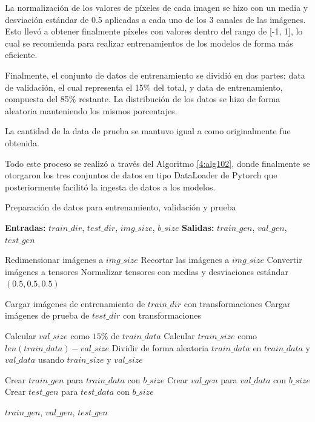 La normalización de los valores de píxeles de cada imagen se hizo con un media y desviación estándar de 0.5 aplicadas a cada uno de los 3 canales de las imágenes. Esto llevó a obtener finalmente píxeles con valores dentro del rango de [-1, 1], lo cual se recomienda para realizar entrenamientos de los modelos de forma más eficiente.

Finalmente, el conjunto de datos de entrenamiento se dividió en dos partes: data de validación, el cual representa el 15\% del total, y data de entrenamiento, compuesta del 85\% restante. La distribución de los datos se hizo de forma aleatoria manteniendo los mismos porcentajes.

La cantidad de la data de prueba se mantuvo igual a como originalmente fue obtenida.

Todo este proceso se realizó a través del Algoritmo \ref{4:alg102}, donde finalmente se otorgaron los tres conjuntos de datos en tipo DataLoader de Pytorch que posteriormente facilitó la ingesta de datos a los modelos.

\begin{algorithm}[H]
	\caption{Preparación de datos para entrenamiento, validación y prueba}
	\label{4:alg102}
	\begin{algorithmic}[1]
		\State \textbf{Entradas:} $train\_dir$, $test\_dir$, $img\_size$, $b\_size$
		\State \textbf{Salidas:} $train\_gen$, $val\_gen$, $test\_gen$
		
			\State Redimensionar imágenes a $img\_size$
			\State Recortar las imágenes a $img\_size$
			\State Convertir imágenes a tensores
			\State Normalizar tensores con medias y desviaciones estándar $(0.5, 0.5, 0.5)$
		\EndProcedure
		
			\State Cargar imágenes de entrenamiento de $train\_dir$ con transformaciones
			\State Cargar imágenes de prueba de $test\_dir$ con transformaciones
		\EndProcedure
		
			\State Calcular $val\_size$ como $15\%$ de $train\_data$
			\State Calcular $train\_size$ como $len(train\_data) - val\_size$
			\State Dividir de forma aleatoria $train\_data$ en $train\_data$ y $val\_data$ usando $train\_size$ y $val\_size$
		\EndProcedure
		
			\State Crear $train\_gen$ para $train\_data$ con $b\_size$
			\State Crear $val\_gen$ para $val\_data$ con $b\_size$
			\State Crear $test\_gen$ para $test\_data$ con $b\_size$
		\EndProcedure
		
		\State \Return $train\_gen$, $val\_gen$, $test\_gen$
	\end{algorithmic}
\end{algorithm}

